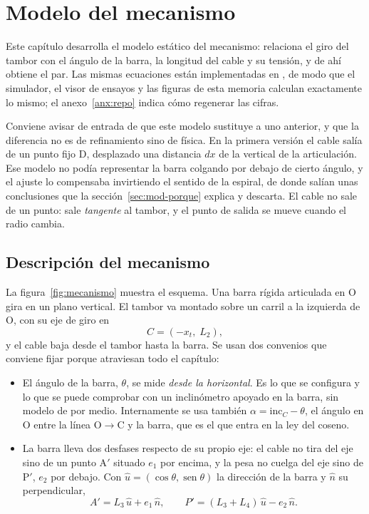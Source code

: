 \chapter{Modelo del mecanismo}
\label{chap:modelo}

Este capítulo desarrolla el modelo estático del mecanismo: relaciona el giro del tambor con el
ángulo de la barra, la longitud del cable y su tensión, y de ahí obtiene el par. Las mismas
ecuaciones están implementadas en , de modo que el simulador, el visor
de ensayos y las figuras de esta memoria calculan exactamente lo mismo; el
anexo~\ref{anx:repo} indica cómo regenerar las cifras.

Conviene avisar de entrada de que este modelo sustituye a uno anterior, y que la diferencia no es de
refinamiento sino de física. En la primera versión el cable salía de un punto fijo D, desplazado una
distancia $dx$ de la vertical de la articulación. Ese modelo no podía representar la barra colgando
por debajo de cierto ángulo, y el ajuste lo compensaba invirtiendo el sentido de la espiral, de donde
salían unas conclusiones que la sección~\ref{sec:mod-porque} explica y descarta. El cable no sale de
un punto: sale \emph{tangente} al tambor, y el punto de salida se mueve cuando el radio cambia.

\section{Descripción del mecanismo}

La figura~\ref{fig:mecanismo} muestra el esquema. Una barra rígida articulada en O gira en un plano
vertical. El tambor va montado sobre un carril a la izquierda de O, con su eje de giro en
\begin{equation}
  C = (-x_t,\; L_2),
\end{equation}
y el cable baja desde el tambor hasta la barra. Se usan dos convenios que conviene fijar porque
atraviesan todo el capítulo:

\begin{itemize}
  \item El ángulo de la barra, $\theta$, se mide \emph{desde la horizontal}. Es lo que se configura y
        lo que se puede comprobar con un inclinómetro apoyado en la barra, sin modelo de por medio.
        Internamente se usa también $\alpha = \mathrm{inc}_C - \theta$, el ángulo en O entre la línea
        O$\to$C y la barra, que es el que entra en la ley del coseno.
  \item La barra lleva dos desfases respecto de su propio eje: el cable no tira del eje sino de un
        punto A$'$ situado $e_1$ por encima, y la pesa no cuelga del eje sino de P$'$, $e_2$ por
        debajo. Con $\hat u = (\cos\theta, \operatorname{sen}\theta)$ la dirección de la barra y
        $\hat n$ su perpendicular,
        \begin{equation}
          A' = L_3\,\hat u + e_1\,\hat n, \qquad P' = (L_3+L_4)\,\hat u - e_2\,\hat n .
        \end{equation}
\end{itemize}

